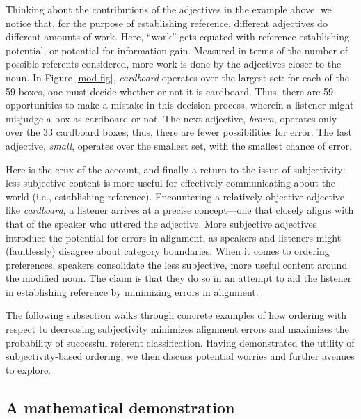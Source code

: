 \documentclass{sp}
\newcommand{\jd}[1]{\textcolor{Blue}{[jd: #1]}}
\begin{document}
Thinking about the contributions of the adjectives in the example above, we notice that, for the purpose of establishing reference, different adjectives do different amounts of work. Here, ``work'' gets equated with reference-establishing potential, or potential for information gain. Measured in terms of the number of possible referents considered, more work is done by the adjectives closer to the noun. In Figure \ref{mod-fig}, %
\emph{cardboard} operates over the largest set: for each of the 59 boxes, one must decide whether or not it is cardboard. Thus, there are 59 opportunities to make a mistake in this decision process, wherein a listener might misjudge a box as cardboard or not. The next adjective, \emph{brown}, operates only over the 33 cardboard boxes; thus, there are fewer possibilities for error. The last adjective, \emph{small}, operates over the smallest set, with the smallest chance of error.

Here is the crux of the account, and finally a return to the issue of subjectivity: less subjective content is more useful for effectively communicating about the world (i.e., establishing reference). %
Encountering a relatively objective adjective like \emph{cardboard}, a listener arrives at a precise concept---one that closely aligns with that of the speaker who uttered the adjective. More subjective adjectives introduce the potential for errors in alignment, as speakers and listeners might (faultlessly) disagree about category boundaries. When it comes to ordering preferences, speakers consolidate the less subjective, more useful content around the modified noun. The claim is that they do so in an attempt to aid the listener in establishing reference by minimizing errors in alignment. 

The following subsection walks through concrete examples of how ordering with respect to decreasing subjectivity minimizes alignment errors and maximizes the probability of successful referent classification. Having demonstrated the utility of subjectivity-based ordering, we then discuss potential worries and further avenues to explore.

\subsection{A mathematical demonstration}
\end{document}
